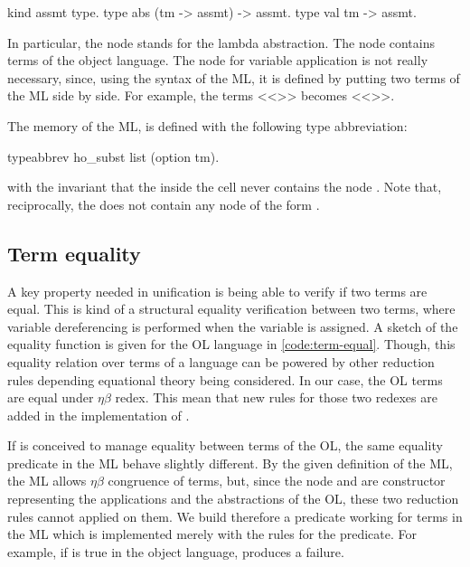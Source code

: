 \documentclass[sigconf,natbib=false]{acmart}
\begin{document}
\begin{elpicode}
  kind assmt type.
  type abs (tm -> assmt) -> assmt.
  type val tm -> assmt.
\end{elpicode}

\noindent
In particular, the node  stands for the lambda abstraction. The
node  contains terms of the object language. The node for variable
application is not really necessary, since, using the syntax of the ML, it is
defined by putting two terms of the ML side by side. For example, the terms 
<<>> becomes <<>>.

The memory of the ML, is defined with the following type abbreviation:

\begin{elpicode}
  typeabbrev ho_subst list (option tm).
\end{elpicode}

\noindent
with the invariant that the  inside the cell never contains the node
. Note that, reciprocally, the  does not contain
any node of the form .

\subsection{Term equality}

\old

A key property needed in unification is being able to verify if two terms are
equal. This is kind of a structural equality verification between two terms,
where variable dereferencing is performed when the variable is assigned. A
sketch of the equality function is given for the OL language in
\cref{code:term-equal}. Though, this equality relation over terms of a language
can be powered by other reduction rules depending equational theory being
considered. In our case, the OL terms are equal under $\eta\beta$ redex. This mean
that new rules for those two redexes are added in the implementation of
.

If  is conceived to manage equality between terms of the OL,
the same equality predicate in the ML behave slightly different. By the given
definition of the ML, the ML allows $\eta\beta$ congruence of terms, but, since
the node  and  are constructor representing the
applications and the abstractions of the OL, these two reduction rules cannot
applied on them. We build therefore a predicate  working for terms
in the ML which is implemented merely with the rules for the 
predicate. For example, if  is true in the object language,  produces a failure.
\end{document}
